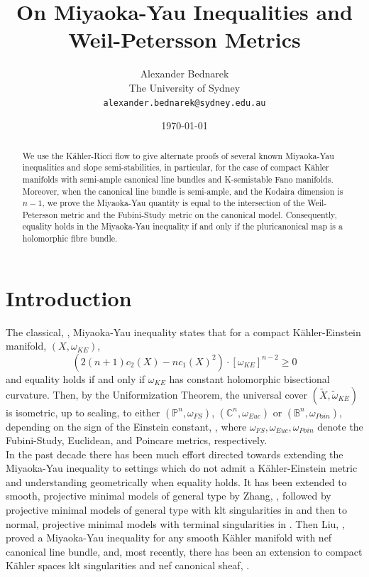 \documentclass[12pt]{article}
\numberwithin{equation}{section}
\newcommand{\C}{\mathbb{C}}
\renewcommand{\P}{\mathbb{P}}
\begin{document}
\title{On Miyaoka-Yau Inequalities and Weil-Petersson Metrics}

\author{Alexander Bednarek\\The University of Sydney\\ \texttt{alexander.bednarek@sydney.edu.au}}

\date{\today}
\maketitle

\begin{abstract}
\noindent We use the K\"ahler-Ricci flow to give alternate proofs of several known Miyaoka-Yau inequalities and slope semi-stabilities, in particular, for the case of compact K\"ahler manifolds with semi-ample canonical line bundles and K-semistable Fano manifolds. Moreover, when the canonical line bundle is semi-ample, and the Kodaira dimension is $n-1$, we prove the Miyaoka-Yau quantity is equal to the intersection of the Weil-Petersson metric and the Fubini-Study metric on the canonical model. Consequently, equality holds in the Miyaoka-Yau inequality if and only if the pluricanonical map is a holomorphic fibre bundle.
\end{abstract}

\section{Introduction}

\noindent The classical, \cite{M77,Y77}, Miyaoka-Yau inequality states that for a compact K\"ahler-Einstein manifold, $(X,\omega_{KE})$,
\begin{equation*}
    (2(n+1)c_2(X) - n c_1(X)^2 ) \cdot [\omega_{KE}]^{n-2} \geq 0
\end{equation*}
and equality holds if and only if $\omega_{KE}$ has constant holomorphic bisectional curvature. Then, by the Uniformization Theorem, the universal cover $(\tilde{X}, \tilde{\omega}_{KE})$ is isometric, up to scaling, to either $(\P^n, \omega_{FS})$, $(\C^n, \omega_{Euc})$ or $(\mathbb{B}^n, \omega_{Poin})$, depending on the sign of the Einstein constant, \cite{T00}, where $\omega_{FS}, \omega_{Euc}, \omega_{Poin}$ denote the Fubini-Study, Euclidean, and Poincare metrics, respectively.\\

\noindent In the past decade there has been much effort directed towards extending the Miyaoka-Yau inequality to settings which do not admit a K\"ahler-Einstein metric and understanding geometrically when equality holds. It has been extended to smooth, projective minimal models of general type by Zhang, \cite{Z09}, followed by projective minimal models of general type with klt singularities in \cite{GKPT19} and then to normal, projective minimal models with terminal singularities in \cite{GT22}. Then Liu, \cite{L23}, proved a Miyaoka-Yau inequality for any smooth K\"ahler manifold with nef canonical line bundle, and, most recently, there has been an extension to compact K\"ahler spaces klt singularities and nef canonical sheaf, \cite{ZZZ25}.\\
\end{document}
